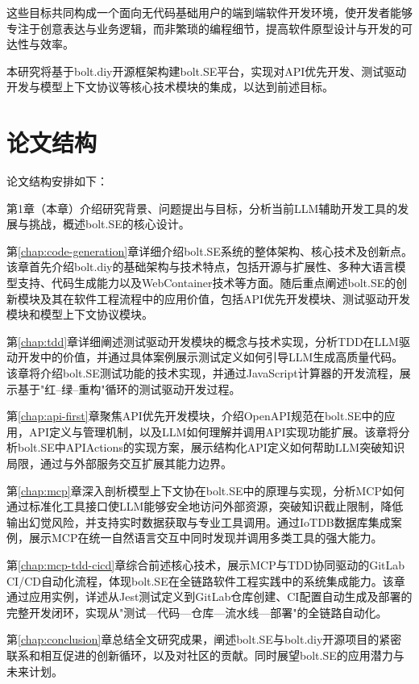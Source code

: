 这些目标共同构成一个面向无代码基础用户的端到端软件开发环境，使开发者能够专注于创意表达与业务逻辑，而非繁琐的编程细节，提高软件原型设计与开发的可达性与效率。

本研究将基于bolt.diy开源框架构建bolt.SE平台，实现对API优先开发、测试驱动开发与模型上下文协议等核心技术模块的集成，以达到前述目标。

\section{论文结构}
论文结构安排如下：

第1章（本章）介绍研究背景、问题提出与目标，分析当前LLM辅助开发工具的发展与挑战，概述bolt.SE的核心设计。

第\ref{chap:code-generation}章详细介绍bolt.SE系统的整体架构、核心技术及创新点。该章首先介绍bolt.diy的基础架构与技术特点，包括开源与扩展性、多种大语言模型支持、代码生成能力以及WebContainer技术等方面。随后重点阐述bolt.SE的创新模块及其在软件工程流程中的应用价值，包括API优先开发模块、测试驱动开发模块和模型上下文协议模块。

第\ref{chap:tdd}章详细阐述测试驱动开发模块的概念与技术实现，分析TDD在LLM驱动开发中的价值，并通过具体案例展示测试定义如何引导LLM生成高质量代码。该章将介绍bolt.SE测试功能的技术实现，并通过JavaScript计算器的开发流程，展示基于"红–绿–重构"循环的测试驱动开发过程。

第\ref{chap:api-first}章聚焦API优先开发模块，介绍OpenAPI规范在bolt.SE中的应用，API定义与管理机制，以及LLM如何理解并调用API实现功能扩展。该章将分析bolt.SE中APIActions的实现方案，展示结构化API定义如何帮助LLM突破知识局限，通过与外部服务交互扩展其能力边界。

第\ref{chap:mcp}章深入剖析模型上下文协在bolt.SE中的原理与实现，分析MCP如何通过标准化工具接口使LLM能够安全地访问外部资源，突破知识截止限制，降低输出幻觉风险，并支持实时数据获取与专业工具调用。通过IoTDB数据库集成案例，展示MCP在统一自然语言交互中同时发现并调用多类工具的强大能力。

第\ref{chap:mcp-tdd-cicd}章综合前述核心技术，展示MCP与TDD协同驱动的GitLab CI/CD自动化流程，体现bolt.SE在全链路软件工程实践中的系统集成能力。该章通过应用实例，详述从Jest测试定义到GitLab仓库创建、CI配置自动生成及部署的完整开发闭环，实现从"测试—代码—仓库—流水线—部署"的全链路自动化。

第\ref{chap:conclusion}章总结全文研究成果，阐述bolt.SE与bolt.diy开源项目的紧密联系和相互促进的创新循环，以及对社区的贡献。同时展望bolt.SE的应用潜力与未来计划。